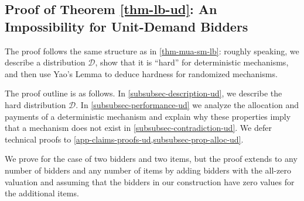 




\subsection{Proof of Theorem \ref{thm-lb-ud}: An Impossibility for Unit-Demand Bidders} \label{lb-ud-proof-place}

The proof follows the same structure as in \cref{thm-mua-sm-lb}: roughly speaking, we describe a distribution $\mathcal{D}$, show that it is “hard” for deterministic mechanisms, and then use Yao's Lemma to deduce hardness for randomized mechanisms.


The proof outline is as follows. In \cref{subsubsec-description-ud}, 
we describe the  hard distribution $\mathcal D$. 
In \cref{subsubsec-performance-ud} we analyze the allocation and payments of a deterministic  mechanism 
and explain why these properties  imply that  a  mechanism does not exist in  \cref{subsubsec-contradiction-ud}.
We defer technical proofs to \cref{app-claims-proofs-ud,subsubsec-prop-alloc-ud}. 

We prove for the case of two bidders and two items, but the proof extends to any number of bidders and any number of items by adding bidders with the all-zero valuation and assuming that the bidders in our construction have zero values for the additional items.


